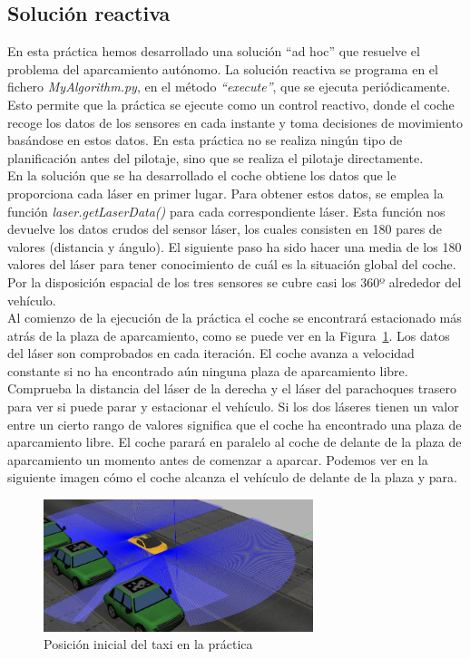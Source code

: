 \subsection{Solución reactiva}
En esta práctica hemos desarrollado una solución ``ad hoc'' que resuelve el problema del aparcamiento autónomo. La solución reactiva se programa en el fichero \textit{MyAlgorithm.py}, en el método \textit{``execute''}, que se ejecuta periódicamente. Esto permite que la práctica se ejecute como un control reactivo, donde el coche recoge los datos de los sensores en cada instante y toma decisiones de movimiento basándose en estos datos. En esta práctica no se realiza ningún tipo de planificación antes del pilotaje, sino que se realiza el pilotaje directamente.\\


En la solución que se ha desarrollado el coche obtiene los datos que le proporciona cada láser en primer lugar. Para obtener estos datos, se emplea la función \textit{laser.getLaserData()} para cada correspondiente láser. Esta función nos devuelve los datos crudos del sensor láser, los cuales consisten en 180 pares de valores (distancia y ángulo). El siguiente paso ha sido hacer una media de los 180 valores del láser para tener conocimiento de cuál es la situación global del coche. Por la disposición espacial de los tres sensores se cubre casi los 360º alrededor del vehículo.\\

Al comienzo de la ejecución de la práctica el coche se encontrará estacionado más atrás de la plaza de aparcamiento, como se puede ver en la Figura~\ref{fig.Posicion1}. Los datos del láser son comprobados en cada iteración. El coche avanza a velocidad constante si no ha encontrado aún ninguna plaza de aparcamiento libre. Comprueba la distancia del láser de la derecha y el láser del parachoques trasero para ver si puede parar y estacionar el vehículo. Si los dos láseres tienen un valor entre un cierto rango de valores significa que el coche ha encontrado una plaza de aparcamiento libre. El coche parará en paralelo al coche de delante de la plaza de aparcamiento un momento antes de comenzar a aparcar. Podemos ver en la siguiente imagen cómo el coche alcanza el vehículo de delante de la plaza y para.


\begin{figure}[H]
  \begin{center}
    \includegraphics[width=0.7\textwidth]{figures/Autopark/Posicion1.png}
		\caption{Posición inicial del taxi en la práctica}
		\label{fig.Posicion1}
		\end{center}
\end{figure}


